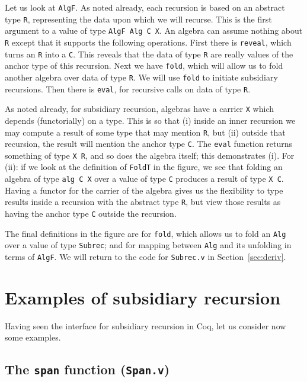 \documentclass[a4paper,USenglish]{lipics-v2021}
\begin{document}
Let us look at \verb|AlgF|.  As noted already, each recursion is based
on an abstract type \verb|R|, representing the data upon which we will
recurse.  This is the first argument to a value of type
\verb|AlgF Alg C X|.  An algebra can assume nothing about \verb|R|
except that it supports the following operations.  First there is
\verb|reveal|, which turns an \verb|R| into a \verb|C|.  This reveals
that the data of type \verb|R| are really values of the anchor type
of this recursion.  Next we have \texttt{fold}, which will allow us to fold
another algebra over data of type \verb|R|.  We will use \verb|fold|
to initiate subsidiary recursions.  Then there is \verb|eval|, for
recursive calls on data of type \verb|R|.

As noted already, for subsidiary recursion, algebras have a carrier
\verb|X| which depends (functorially) on a type.  This is so that (i)
inside an inner recursion we may compute a result of some type that
may mention \verb|R|, but (ii) outside that recursion, the result will
mention the anchor type \verb|C|.  The \verb|eval| function returns
something of type \verb|X R|, and so does the algebra itself; this
demonstrates (i).  For (ii): if we look at the definition of
\verb|FoldT| in the figure, we see that folding an algebra of type
\verb|alg C X| over a value of type \verb|C| produces a result of type
\verb|X C|.  Having a functor for the carrier of the algebra gives us
the flexibility to type results inside a recursion with the abstract
type \verb|R|, but view those results as having the anchor type
\verb|C| outside the recursion.

The final definitions in the figure are for \verb|fold|, which allows
us to fold an \verb|Alg| over a value of type \verb|Subrec|; and for mapping
between \verb|Alg| and its unfolding in terms of \verb|AlgF|.  We will
return to the code for \verb|Subrec.v| in Section~\ref{sec:deriv}.

\section{Examples of subsidiary recursion}
\label{sec:examples}

Having seen the interface for subsidiary recursion in Coq, let us
consider now some examples.

\subsection{The \texttt{span} function (\texttt{Span.v})}
\end{document}
